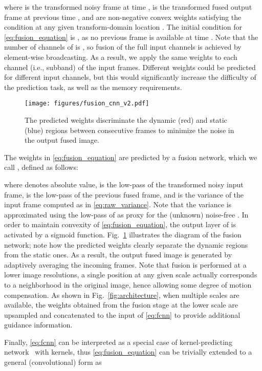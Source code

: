 \documentclass[final]{cvpr}
\begin{document}
    where  is the transformed noisy frame at time ,  is the transformed fused output frame at previous time , and  are non-negative convex weights satisfying the condition  at any given transform-domain location . The initial condition for \eqref{eq:fusion_equation} is , as no previous frame is available at time . Note that the number of channels of  is , so fusion of the full  input channels is achieved by element-wise broadcasting. As a result, we apply the same weights to each channel (i.e., subband) of the input frames. Different weights could be predicted for different input channels, but this would significantly increase the difficulty of the prediction task, as well as the memory requirements. 

    \begin{figure}[t]
        \centering
        \texttt{[image: figures/fusion\_cnn\_v2.pdf]}
        \caption{The predicted weights  discriminate the dynamic (red) and static (blue) regions between consecutive frames to minimize the noise in the output fused image.}
        \label{fig:fusion} 
    \end{figure}
    
    The weights in \eqref{eq:fusion_equation} are predicted by a fusion network, which we call , defined as follows:
    
    where  denotes absolute value,  is the low-pass of the transformed noisy input frame,  is the low-pass of the previous fused frame, and  is the variance of the input frame computed as in \eqref{eq:raw_variance}. Note that the variance is approximated using the low-pass of  as proxy for the (unknown) noise-free . In order to maintain convexity of \eqref{eq:fusion_equation}, the output layer of  is activated by a sigmoid function. Fig.~\ref{fig:fusion} illustrates the diagram of the fusion network; note how the predicted weights  clearly separate the dynamic regions from the static ones. As a result, the output fused image is generated by adaptively averaging the incoming frames. Note that fusion is performed at a lower image resolutions, a single position at any given scale  actually corresponds to a  neighborhood in the original image, hence allowing some degree of motion compensation. As shown in Fig.~\ref{fig:architecture}, when multiple scales are available, the weights obtained from the fusion stage at the lower scale are upsampled and concatenated to the input of \eqref{eq:fcnn} to provide additional guidance information.

    Finally, \eqref{eq:fcnn} can be interpreted as a special case of kernel-predicting network~\cite{mildenhall2018kpn} with  kernels, thus \eqref{eq:fusion_equation} can be trivially extended to a general (convolutional) form as
    
\end{document}
